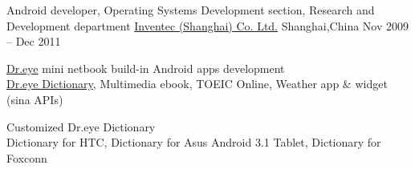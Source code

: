 \begin{cventries}
	\cventry
	{Android developer, Operating Systems Development section, Research and Development department}
	{\href{http://www.inventec.com/english/indexEN.htm}{Inventec (Shanghai) Co. Ltd.}}
	{Shanghai,\enskip China}
	{Nov 2009 – Dec 2011}
	{
		\begin{cvitems}
			\item {\href{http://www.androidcentral.com/android-powered-dr-eye-makes-its-debut}{Dr.eye} mini netbook build-in Android apps development\\
			\href{https://play.google.com/store/apps/details?id=com.inventec.dreye.dictnew}{Dr.eye Dictionary}, Multimedia ebook, TOEIC Online, Weather app \& widget (sina APIs)}
			\item {Customized Dr.eye Dictionary\\
			Dictionary for HTC, Dictionary for Asus Android 3.1 Tablet, Dictionary for Foxconn}
		\end{cvitems}
	}
\end{cventries}

